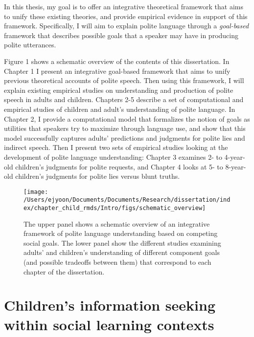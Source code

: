 \documentclass[oneside]{report}
\begin{document}
In this thesis, my goal is to offer an integrative theoretical framework
that aims to unify these existing theories, and provide empirical
evidence in support of this framework. Specifically, I will aim to
explain polite language through a \emph{goal-based} framework that
describes possible goals that a speaker may have in producing polite
utterances.

Figure 1 shows a schematic overview of the contents of this
dissertation. In Chapter 1 I present an integrative goal-based framework
that aims to unify previous theoretical accounts of polite speech. Then
using this framework, I will explain existing empirical studies on
understanding and production of polite speech in adults and children.
Chapters 2-5 describe a set of computational and empirical studies of
children and adult's understanding of polite language. In Chapter 2, I
provide a computational model that formalizes the notion of goals as
utilities that speakers try to maximize through language use, and show
that this model successfully captures adults' predictions and judgments
for polite lies and indirect speech. Then I present two sets of
empirical studies looking at the development of polite language
understanding: Chapter 3 examines 2- to 4-year-old children's judgments
for polite requests, and Chapter 4 looks at 5- to 8-year-old children's
judgments for polite lies versus blunt truths.
\begin{figure}[!t]

{\centering \texttt{[image: /Users/ejyoon/Documents/Documents/Research/dissertation/index/chapter\_child\_rmds/Intro/figs/schematic\_overview]} 

}

\caption[Schematic overview of the dissertation content.]{The upper panel shows a schematic overview of an integrative framework of polite language understanding based on competing social goals. The lower panel show the different studies examining adults' and children's understanding of different component goals (and possible tradeoffs between them) that correspond to each chapter of the dissertation.}\label{fig:schematic-overview}
\end{figure}
\chapter{Children's information seeking within social learning
contexts}\label{childrens-information-seeking-within-social-learning-contexts}

\end{document}
